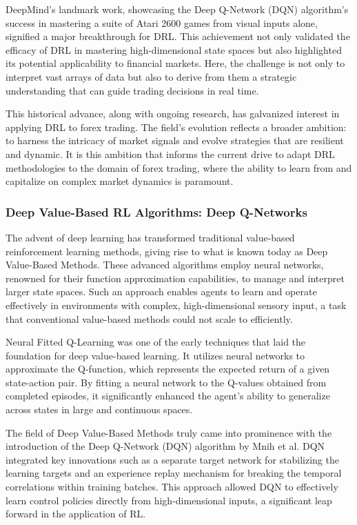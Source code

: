 DeepMind's landmark work, showcasing the Deep Q-Network (DQN) algorithm's success in mastering a suite of Atari 2600 games from visual inputs alone, signified a major breakthrough for DRL. This achievement not only validated the efficacy of DRL in mastering high-dimensional state spaces but also highlighted its potential applicability to financial markets. Here, the challenge is not only to interpret vast arrays of data but also to derive from them a strategic understanding that can guide trading decisions in real time.

This historical advance, along with ongoing research, has galvanized interest in applying DRL to forex trading. The field's evolution reflects a broader ambition: to harness the intricacy of market signals and evolve strategies that are resilient and dynamic. It is this ambition that informs the current drive to adapt DRL methodologies to the domain of forex trading, where the ability to learn from and capitalize on complex market dynamics is paramount.

\subsubsection{Deep Value-Based RL Algorithms: Deep Q-Networks}

The advent of deep learning has transformed traditional value-based reinforcement learning methods, giving rise to what is known today as Deep Value-Based Methods. These advanced algorithms employ neural networks, renowned for their function approximation capabilities, to manage and interpret larger state spaces. Such an approach enables agents to learn and operate effectively in environments with complex, high-dimensional sensory input, a task that conventional value-based methods could not scale to efficiently.

Neural Fitted Q-Learning was one of the early techniques that laid the foundation for deep value-based learning. It utilizes neural networks to approximate the Q-function, which represents the expected return of a given state-action pair. By fitting a neural network to the Q-values obtained from completed episodes, it significantly enhanced the agent's ability to generalize across states in large and continuous spaces.

The field of Deep Value-Based Methods truly came into prominence with the introduction of the Deep Q-Network (DQN) algorithm by Mnih et al. DQN integrated key innovations such as a separate target network for stabilizing the learning targets and an experience replay mechanism for breaking the temporal correlations within training batches. This approach allowed DQN to effectively learn control policies directly from high-dimensional inputs, a significant leap forward in the application of RL.

